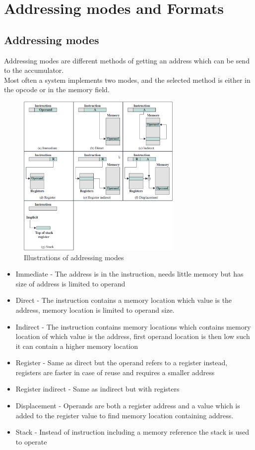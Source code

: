 \documentclass[12pt, a4paper]{article}
\begin{document}
	\section{Addressing modes and Formats}
		\subsection{Addressing modes}
			Addressing modes are different methods of getting an address which can be send to the accumulator.\\
			Most often a system implements two modes, and the selected method is either in the opcode or in the memory field.\\
			\begin{figure}[h!]
				\centering
				\includegraphics[width=300px]{assets/addressingModes.png}
				\caption{Illustrations of addressing modes}
			\end{figure}
			\begin{itemize}
				\item Immediate - The address is in the instruction, needs little memory but has size of address is limited to operand
				\item Direct - The instruction contains a memory location which value is the address, memory location is limited to operand size.
				\item Indirect - The instruction contains memory locations which contains memory location of which value is the address, first operand location is then low such it can contain a higher memory location
				\item Register - Same as direct but the operand refers to a register instead, registers are faster in case of reuse and requires a smaller address
				\item Register indirect - Same as indirect but with registers
				\item Displacement - Operands are both a register address and a value which is added to the register value to find memory location containing address.
				\item Stack - Instead of instruction including a memory reference the stack is used to operate
			\end{itemize}
\end{document}
